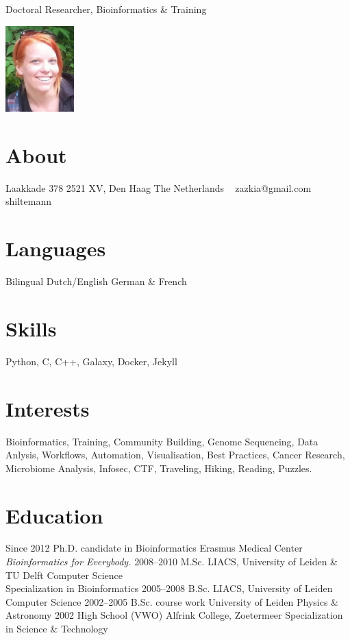 \documentclass[]{shiltemann-cv}
\begin{document}
       {Doctoral Researcher, Bioinformatics \& Training}


\begin{aside}
  \includegraphics[width=75pt]{foto.jpg}
  \section{About}
    Laakkade 378
    2521 XV, Den Haag
    The Netherlands
    ~
    zazkia@gmail.com \faEnvelope
    shiltemann \faGithub \ \faTwitter \ \faLinkedin
    \
  \section{Languages}
    Bilingual Dutch/English
    German \& French
  \section{Skills}
    Python, C, C++, Galaxy, Docker, Jekyll
\end{aside}

\section{Interests}

Bioinformatics, Training, Community Building, Genome Sequencing, Data Anlysis, Workflows, Automation, Visualisation, Best Practices, Cancer Research, Microbiome Analysis, Infosec, CTF, Traveling, Hiking, Reading, Puzzles.

\section{Education}

\begin{entrylist}
  \entry
    {Since 2012}
    {Ph.D. {\normalfont candidate in Bioinformatics}}
    {Erasmus Medical Center}
    {\emph{Bioinformatics for Everybody.}}
  \entry
    {2008–2010}
    {M.Sc.}
    {LIACS, University of Leiden \& TU Delft}
    {Computer Science\\
    Specialization in Bioinformatics}
  \entry
    {2005–2008}
    {B.Sc.}
    {LIACS, University of Leiden}
    {Computer Science}
  \entry
    {2002–2005}
    {B.Sc. course work}
    {University of Leiden}
    {Physics \& Astronomy}
  \entry
    {2002}
    {High School (VWO)}
    {Alfrink College, Zoetermeer}
    {Specialization in Science \& Technology}
\end{entrylist}
\end{document}
